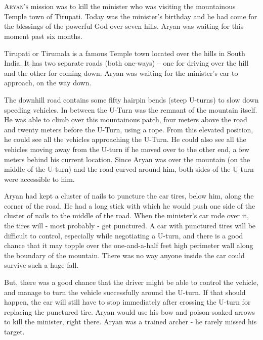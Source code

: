 
\chapter{}

\lettrine{A}{ryan's} mission was to kill the minister who was visiting the mountainous Temple
town of Tirupati. Today was the minister's birthday and he had come for the
blessings of the powerful God over seven hills. Aryan was waiting for this
moment past six months.

Tirupati or Tirumala is a famous Temple town located over the hills in South
India. It has two separate roads (both one-ways) – one for driving over the hill
and the other for coming down. Aryan was waiting for the minister's car to
approach, on the way down.

The downhill road contains some fifty hairpin bends (steep U-turns) to slow down
speeding vehicles. In between the U-Turn was the remnant of the mountain itself.
He was able to climb over this mountainous patch, four meters above the road and
twenty meters before the U-Turn, using a rope. From this elevated position, he
could see all the vehicles approaching the U-Turn. He could also see all the
vehicles moving away from the U-turn if he moved over to the other end, a few
meters behind his current location. Since Aryan was over the mountain (on the
middle of the U-turn) and the road curved around him, both sides of the U-turn
were accessible to him.

Aryan had kept a cluster of nails to puncture the car tires, below him, along
the corner of the road. He had a long stick with which he would push one side of
the cluster of nails to the middle of the road. When the minister's car rode
over it, the tires will - most probably - get punctured. A car with punctured
tires will be difficult to control, especially while negotiating a U-turn, and
there is a good chance that it may topple over the one-and-a-half feet high
perimeter wall along the boundary of the mountain. There was no way anyone
inside the car could survive such a huge fall.

But, there was a good chance that the driver might be able to control the
vehicle, and manage to turn the vehicle successfully around the U-turn. If that
should happen, the car will still have to stop immediately after crossing the
U-turn for replacing the punctured tire. Aryan would use his bow and
poison-soaked arrows to kill the minister, right there. Aryan was a trained
archer - he rarely missed his target.

